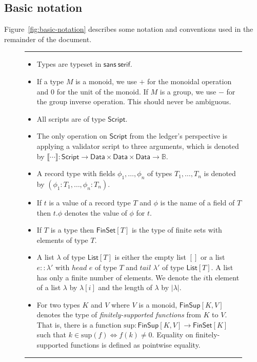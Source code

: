 \documentclass[a4paper]{article}
\newcounter{note}
\newcommand{\s}{\textsf}  %
\newcommand\rfskip{7pt}
\newenvironment{ruledfigure}[1]{\begin{figure}[#1]\hrule\vspace{\rfskip}}{\vspace{\rfskip}\hrule\end{figure}}
\newcommand{\List}[1]{\ensuremath{\s{List}[#1]}}
\newcommand{\FinSet}[1]{\ensuremath{\s{FinSet}[#1]}}
\newcommand{\FinSup}[2]{\ensuremath{\s{FinSup}[#1,#2]}}
\newcommand{\support}{\ensuremath{\mathrm{sup}}}
\newcommand{\script}{\ensuremath{\s{Script}}}
\newcommand{\Data}{\ensuremath{\mathsf{Data}}}
\newcommand\B{\ensuremath{\mathbb{B}}}
\begin{document}
\subsection{Basic notation}
Figure~\ref{fig:basic-notation} describes some notation and
conventions used in the remainder of the document.
\begin{ruledfigure}{H}
  \begin{itemize}
\item Types are typeset in $\mathsf{sans~serif}$.

\item If a type $M$ is a monoid, we use $+$ for the monoidal operation and $0$
  for the unit of the monoid. If $M$ is a group, we use $-$ for the group
  inverse operation. This should never be ambiguous.

\item All scripts are of type \script{}.

\item The only operation on \script{} from the ledger's
  perspective is applying a validator script to three arguments,
  which is denoted by $\llbracket \cdots \rrbracket :
  \script \rightarrow \Data \times \Data
    \times \Data \rightarrow \B$.

\item A record type with fields $\phi_1, \ldots, \phi_n$ of types $T_1,
  \ldots, T_n$ is denoted by $(\phi_1 : T_1, \ldots, \phi_n : T_n)$.

\item If $t$ is a value of a record type $T$ and $\phi$ is the name
  of a field of $T$ then $t.\phi$ denotes the value of $\phi$ for
  $t$.

\item If $T$ is a type then $\FinSet{T}$ is the type of finite sets
  with elements of type $T$.

\item A list $\lambda$ of type $\List{T}$ is either the empty list
  $[]$ or a list $e :: \lambda'$ with $head$ $e$ of type $T$ and
  $tail$ $\lambda'$ of type $\List{T}$. A list has only a finite
  number of elements.  We denote the $i$th element of a list $\lambda$ by
  $\lambda[i]$ and the length of $\lambda$ by $\left|\lambda\right|$.

  \item For two types $K$ and $V$ where $V$ is a monoid, $\FinSup{K}{V}$ denotes the type of
    \textit{finitely-supported functions} from $K$ to $V$. That is, there is a
    function $\support : \FinSup{K}{V} \rightarrow \FinSet{K}$ such that
    $k \in \support(f) \Leftrightarrow f(k) \neq 0$.
    Equality on finitely-supported functions is defined as pointwise equality.


\end{itemize}
\end{ruledfigure}
\end{document}
